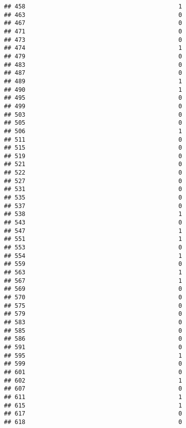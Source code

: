 \documentclass[
]{article}
\begin{document}
\begin{verbatim}
## 458                                           1
## 463                                           0
## 467                                           0
## 471                                           0
## 473                                           0
## 474                                           1
## 479                                           0
## 483                                           0
## 487                                           0
## 489                                           1
## 490                                           1
## 495                                           0
## 499                                           0
## 503                                           0
## 505                                           0
## 506                                           1
## 511                                           0
## 515                                           0
## 519                                           0
## 521                                           0
## 522                                           0
## 527                                           0
## 531                                           0
## 535                                           0
## 537                                           0
## 538                                           1
## 543                                           0
## 547                                           1
## 551                                           1
## 553                                           0
## 554                                           1
## 559                                           0
## 563                                           1
## 567                                           1
## 569                                           0
## 570                                           0
## 575                                           0
## 579                                           0
## 583                                           0
## 585                                           0
## 586                                           0
## 591                                           0
## 595                                           1
## 599                                           0
## 601                                           0
## 602                                           1
## 607                                           0
## 611                                           1
## 615                                           1
## 617                                           0
## 618                                           0

\end{verbatim}
\end{document}
